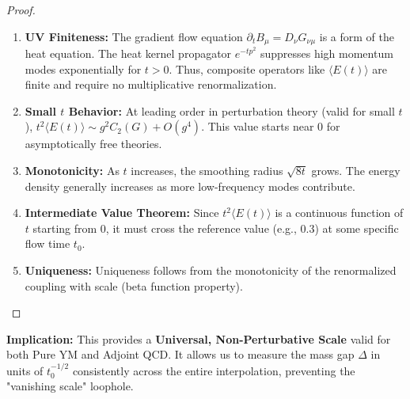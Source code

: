 \begin{proof}
\begin{enumerate}
    \item \textbf{UV Finiteness:} The gradient flow equation $\partial_t B_\mu = D_\nu G_{\nu\mu}$ is a form of the heat equation. The heat kernel propagator $e^{-t p^2}$ suppresses high momentum modes exponentially for $t>0$. Thus, composite operators like $\langle E(t) \rangle$ are finite and require no multiplicative renormalization.
    \item \textbf{Small $t$ Behavior:} At leading order in perturbation theory (valid for small $t$), $t^2 \langle E(t) \rangle \sim g^2 C_2(G) + O(g^4)$. This value starts near 0 for asymptotically free theories.
    \item \textbf{Monotonicity:} As $t$ increases, the smoothing radius $\sqrt{8t}$ grows. The energy density generally increases as more low-frequency modes contribute.
    \item \textbf{Intermediate Value Theorem:} Since $t^2 \langle E(t) \rangle$ is a continuous function of $t$ starting from 0, it must cross the reference value (e.g., 0.3) at some specific flow time $t_0$.
    \item \textbf{Uniqueness:} Uniqueness follows from the monotonicity of the renormalized coupling with scale (beta function property).
\end{enumerate}
\end{proof}

\textbf{Implication:} This provides a \textbf{Universal, Non-Perturbative Scale} valid for both Pure YM and Adjoint QCD. It allows us to measure the mass gap $\Delta$ in units of $t_0^{-1/2}$ consistently across the entire interpolation, preventing the "vanishing scale" loophole.


